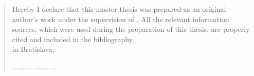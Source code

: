 \thispagestyle{empty}

\vspace*{\fill}
\begin{quote}
Hereby I declare that this master thesis was prepared as an original author's work under the supervision of \mySupervisor. All the relevant information sources, which were used during the  preparation of this thesis, are properly cited and included in the bibliography.\\

in Bratislava,
\begin{flushright}
......................\\
\myName
\end{flushright}
\end{quote}


\newpage{}\thispagestyle{empty}

\newpage
\thispagestyle{empty}
\mbox{}
